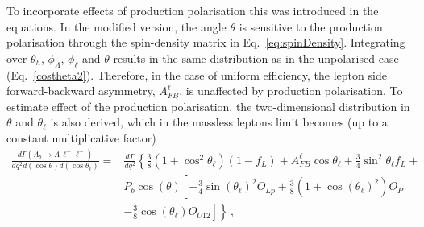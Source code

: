 To incorporate effects of production polarisation this was introduced in the equations.
%
In the modified version, the angle $\theta$ is sensitive to the production polarisation
through the spin-density matrix in Eq.~\ref{eq:spinDensity}. 
Integrating over $\theta_h$, $\phi_\Lambda$, $\phi_\ell$ and $\theta$ results in 
the same distribution as in the unpolarised case (Eq.~\ref{costheta2}). Therefore, in the case of uniform
efficiency, the lepton side forward-backward asymmetry, $A_{FB}^\ell$, is unaffected by production
polarisation. To estimate effect of the production polarisation, the two-dimensional
distribution in $\theta$ and $\theta_\ell$ is also derived, which in the massless leptons
limit becomes (up to a  constant multiplicative factor)
%
\begin{align}
\frac{d\Gamma(\Lambda_{b}\to \Lambda \,\ell^{+}\ell^{-})}{dq^2d(\cos\theta) d(\cos\theta_\ell)}=&
\frac{d\Gamma}{dq^2}\left\{  \frac{3}{8}\left(1+\cos^2\theta_\ell\right)(1-f_L)+A_{FB}^\ell\cos\theta_\ell +
   \frac{3}{4}\sin^2\theta_\ell f_L+\right. \nonumber \\
&P_b\cos(\theta)\left[ -\frac{3}{4}\sin(\theta_\ell)^2O_{Lp}+
  \frac{3}{8}\left(1+\cos(\theta_\ell)^2\right)O_P\right. \nonumber \\
&\left.\left.-\frac{3}{8}\cos(\theta_\ell)O_{U12} \right]\right\}\,,
\label{eq:lepton2D}
\end{align}
